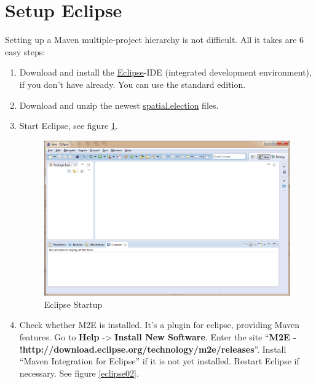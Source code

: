 
\section{Setup Eclipse}

Setting up a Maven multiple-project hierarchy is not difficult. All it
takes are 6 easy steps:

\begin{enumerate}
\def\labelenumi{\arabic{enumi}.}
\item
  Download and install the
  \href{https://www.eclipse.org/downloads/}{Eclipse}-IDE (integrated
  development environment), if you don't have already. You can use the
  standard edition.
\item
  Download and unzip the newest
  \href{https://github.com/a-d/spatial.election/archive/master.zip}{spatial.election}
  files.
\item
  Start Eclipse, see figure \ref{eclipse01}.
  
  \begin{figure}[htbp]
  \centering
  \includegraphics[width=1.1\textwidth]{../img/GMXSI1f.png}
  \caption{Eclipse Startup}
  \label{eclipse01}
  \end{figure}
  
\item
  Check whether M2E is installed. It's a plugin for eclipse, providing
  Maven features. Go to \textbf{Help} -\textgreater{} \textbf{Install
  New Software}. Enter the site ``\textbf{M2E -
  !http://download.eclipse.org/technology/m2e/releases}''. Install
  ``Maven Integration for Eclipse'' if it is not yet installed. Restart
  Eclipse if necessary. See figure \ref{eclipse02}. \\


\end{enumerate}
